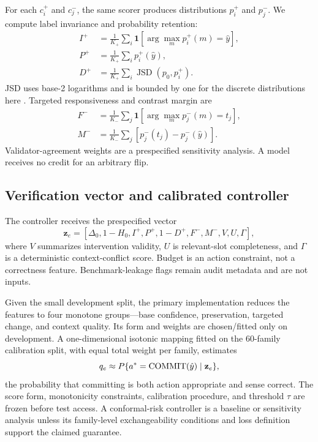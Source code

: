 \documentclass[preprint,12pt,authoryear]{elsarticle}
\newcommand{\commit}{\ifmmode\operatorname{COMMIT}\else\textsc{Commit}\fi}
\begin{document}
For each $c_i^+$ and $c_j^-$, the same scorer produces distributions $p_i^+$
and $p_j^-$. We compute label invariance and probability retention:
\begin{align}
I^+ &=\frac{1}{K_+}\sum_i
\mathbf{1}[\arg\max_m p_i^+(m)=\hat y],\\
P^+ &=\frac{1}{K_+}\sum_i p_i^+(\hat y),\\
D^+ &=\frac{1}{K_+}\sum_i \operatorname{JSD}(p_0,p_i^+).
\end{align}
JSD uses base-2 logarithms and is bounded by one for the discrete
distributions here \citep{lin1991divergence}.
Targeted responsiveness and contrast margin are
\begin{align}
F^- &=\frac{1}{K_-}\sum_j
\mathbf{1}[\arg\max_m p_j^-(m)=t_j],\\
M^- &=\frac{1}{K_-}\sum_j
\left[p_j^-(t_j)-p_j^-(\hat y)\right].
\end{align}
Validator-agreement weights are a prespecified sensitivity analysis. A model
receives no credit for an arbitrary flip.

\subsection{Verification vector and calibrated controller}

The controller receives the prespecified vector
\begin{equation}
\mathbf{z}_e=[\Delta_0,1-H_0,I^+,P^+,1-D^+,F^-,M^-,V,U,\Gamma],
\end{equation}
where $V$ summarizes intervention validity, $U$ is relevant-slot
completeness, and $\Gamma$ is a deterministic context-conflict score. Budget
is an action constraint, not a correctness feature. Benchmark-leakage flags
remain audit metadata and are not inputs.

Given the small development split, the primary implementation reduces the
features to four monotone groups---base confidence, preservation, targeted
change, and context quality. Its form and weights are chosen/fitted only on
development. A one-dimensional isotonic mapping fitted on the 60-family
calibration split, with equal total weight per family, estimates
\citep{zadrozny2002transforming}
\begin{equation}
q_e\approx P\{a^*=\commit(\hat y)\mid\mathbf{z}_e\},
\end{equation}
the probability that committing is both action appropriate and sense correct.
The score form, monotonicity constraints, calibration procedure, and threshold
$\tau$ are frozen before test access. A conformal-risk controller is a baseline
or sensitivity analysis unless its family-level exchangeability conditions
and loss definition support the claimed guarantee.
\end{document}
